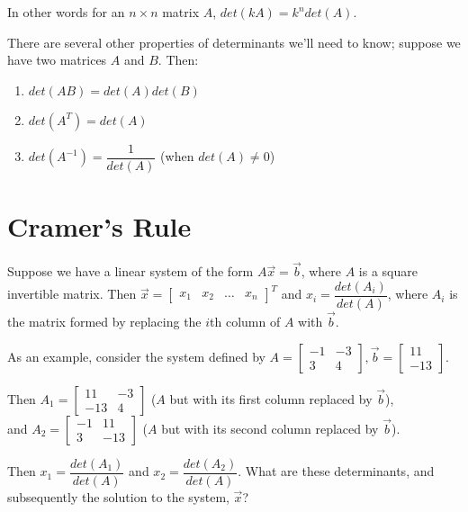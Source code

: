 \documentclass[11pt]{exam}
\begin{document}
    In other words for an $n \times n$ matrix $A$, $det(kA) = k^n det(A)$.

    There are several other properties of determinants we'll need to know; suppose we have two matrices $A$ and $B$. Then:
    \begin{enumerate}
        \item $det(AB) = det(A)det(B)$
        \item $det(A^T) = det(A)$
        \item $det(A^{-1}) = \dfrac{1}{det(A)}$ (when $det(A) \neq 0$)
    \end{enumerate}

\pagebreak
\section{Cramer's Rule}
    
    \vspace{20px}
    Suppose we have a linear system of the form $A\vec{x} = \vec{b}$, where $A$ is a square invertible matrix.
    Then $\vec{x} = \begin{bmatrix} x_1 & x_2 & \dots & x_n \end{bmatrix}^T$ and $x_i = \dfrac{det(A_i)}{det(A)}$, where $A_i$ is the matrix
    formed by replacing the $i$th column of $A$ with $\vec{b}$.

    As an example, consider the system defined by $A = \begin{bmatrix} -1 & -3 \\ 3 & 4 \end{bmatrix},
    \vec{b} = \begin{bmatrix} 11 \\ -13 \end{bmatrix}$.

    Then $A_1 = \begin{bmatrix} 11 & -3 \\ -13 & 4 \end{bmatrix}$ ($A$ but with its first column replaced by $\vec{b}$), \\
    and $A_2 = \begin{bmatrix} -1 & 11 \\ 3 & -13 \end{bmatrix}$ ($A$ but with its second column replaced by $\vec{b}$).

    Then $x_1 = \dfrac{det(A_1)}{det(A)}$ and $x_2 = \dfrac{det(A_2)}{det(A)}$. What are these determinants, and subsequently the solution to the
    system, $\vec{x}$?
\end{document}
